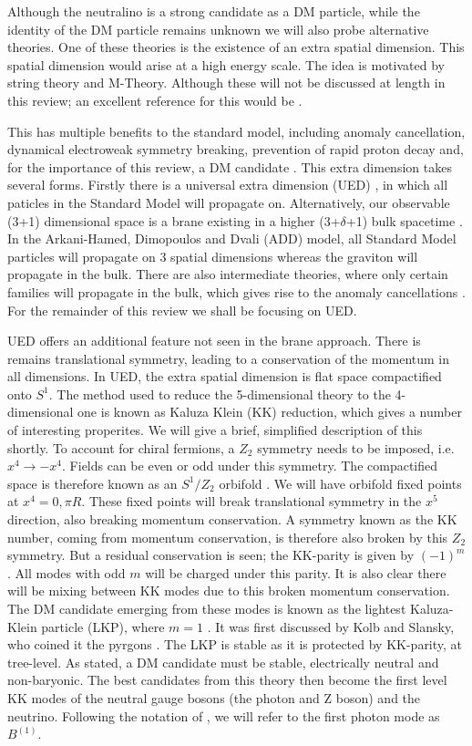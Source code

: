 Although the neutralino is a strong candidate as a DM particle, while the identity of the DM particle remains unknown we will also probe alternative theories. One of these theories is the existence of an extra spatial dimension. This spatial dimension would arise at a high energy scale. The idea is motivated by string theory and M-Theory. Although these will not be discussed at length in this review; an excellent reference for this would be \cite{M-Theory}. 

This has multiple benefits to the standard model, including anomaly cancellation, dynamical electroweak symmetry breaking, prevention of rapid proton decay and, for the importance of this review, a DM candidate \cite{Bertone:2004}. This extra dimension takes several forms. Firstly there is a universal extra dimension (UED) \cite{Appelquist:2000}, in which all paticles in the Standard Model will propagate on. Alternatively, our observable (3+1) dimensional space is a brane existing in a higher (3+$\delta$+1) bulk spacetime \cite{ArkaniHamed:1998rs}. In the Arkani-Hamed, Dimopoulos and Dvali (ADD) model, all Standard Model particles will propagate on 3 spatial dimensions whereas the graviton will propagate in the bulk. There are also intermediate theories, where only certain families will propagate in the bulk, which gives rise to the anomaly cancellations \cite{Dobrescu:2001ae}. For the remainder of this review we shall be focusing on UED. 

UED offers an additional feature not seen in the brane approach. There is remains translational symmetry, leading to a conservation of the momentum in all dimensions. In UED, the extra spatial dimension is flat space compactified onto $S^1$. The method used to reduce the 5-dimensional theory to the 4-dimensional one is known as Kaluza Klein (KK) reduction, which gives a number of interesting properites. We will give a brief, simplified description of this shortly.  To account for chiral fermions, a $Z_2$ symmetry needs to be imposed, i.e. $x^4 \rightarrow - x^4$. Fields can be even or odd under this symmetry.  The compactified space is therefore known as an $S^1/Z_2$ orbifold \cite{Shaw:2014gba}. We will have orbifold fixed points at $x^4 = 0, \pi R$. These fixed points will break translational symmetry in the $x^5$ direction, also breaking momentum conservation. A symmetry known as the KK number, coming from momentum conservation, is therefore also broken by this $Z_2$ symmetry. But a residual conservation is seen; the KK-parity is given by $(-1)^m$. All modes with odd $m$ will be charged under this parity. It is also clear there will be mixing between KK modes due to this broken momentum conservation. The DM candidate emerging from these modes is known as the lightest Kaluza-Klein particle (LKP), where $m=1$ \cite{Servant:2002}. It was first discussed by Kolb and Slansky, who coined it the pyrgons \cite{Kolb:1983fm}. The LKP is stable as it is protected by KK-parity, at tree-level. As stated, a DM candidate must be stable, electrically neutral and non-baryonic. The best candidates from this theory then become the first level KK modes of the neutral gauge bosons (the photon and Z boson) and the neutrino. Following the notation of \cite{Servant:2002}, we will refer to the first photon mode as $B^{(1)}$. 

